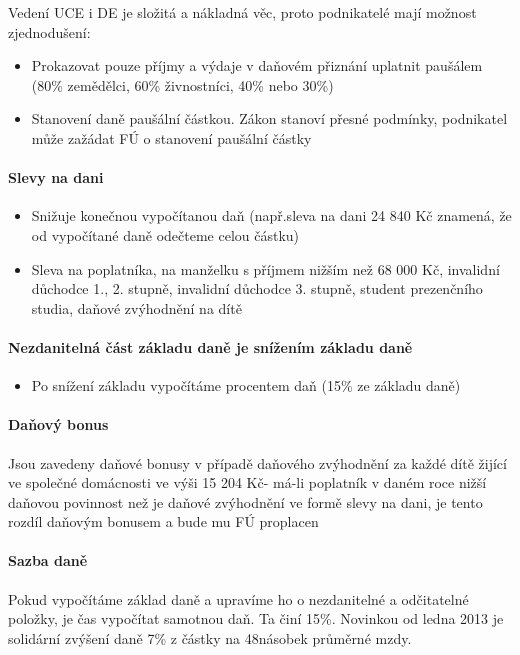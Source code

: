 Vedení UCE i DE je složitá a nákladná věc, proto podnikatelé mají možnost zjednodušení:
\begin{itemize}
    \item Prokazovat pouze příjmy a výdaje v daňovém přiznání uplatnit paušálem (80\% zemědělci, 60\% živnostníci, 40\% nebo 30\%)
    \item Stanovení daně paušální částkou. Zákon stanoví přesné podmínky, podnikatel může zažádat FÚ o stanovení paušální částky
\end{itemize}

\paragraph{Slevy na dani}
\begin{itemize}
    \item Snižuje konečnou vypočítanou daň (např.sleva na dani 24 840 Kč znamená, že od vypočítané daně odečteme celou částku)
    \item Sleva na poplatníka, na manželku s příjmem nižším než 68 000 Kč, invalidní důchodce 1., 2. stupně, invalidní důchodce 3. stupně, student prezenčního studia,
daňové zvýhodnění na dítě
\end{itemize}

\paragraph{Nezdanitelná část základu daně je snížením základu daně}
\begin{itemize}
    \item Po snížení základu vypočítáme procentem daň (15\% ze základu daně)
\end{itemize}

\paragraph{Daňový bonus}
Jsou zavedeny daňové bonusy v případě daňového zvýhodnění za každé dítě žijící ve společné domácnosti ve výši 15 204 Kč- má-li poplatník v daném roce nižší daňovou povinnost než je daňové zvýhodnění ve formě slevy na dani, je tento rozdíl daňovým bonusem a bude mu FÚ proplacen

\paragraph{Sazba daně}
Pokud vypočítáme základ daně a upravíme ho o nezdanitelné a odčitatelné položky, je čas vypočítat samotnou daň. Ta činí 15\%. Novinkou od ledna 2013 je solidární zvýšení daně 7\% z částky na 48násobek průměrné mzdy.

